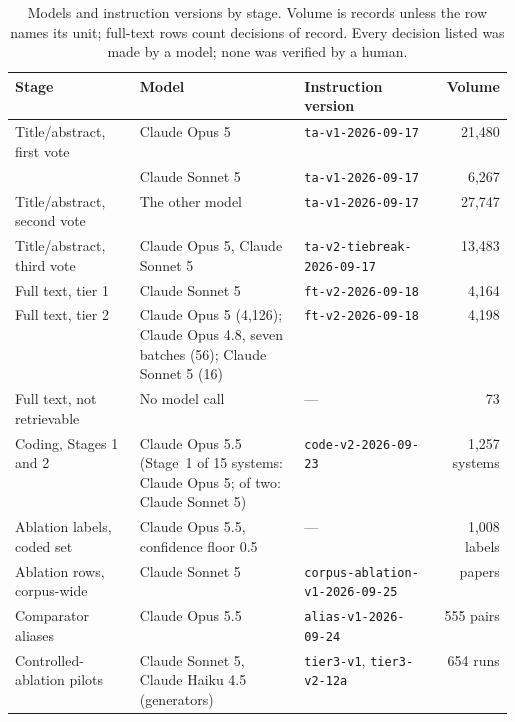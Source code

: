 \begin{table}[t]
  \footnotesize
  \caption{Models and instruction versions by stage. Volume is records unless the row names its unit;
  full-text rows count decisions of record. Every decision listed was made by a model; none was verified
  by a human.}
  \label{tab:implementation}
  \begin{tabular}{@{}p{0.25\linewidth} p{0.33\linewidth} l r@{}}
    \toprule
    Stage & Model & Instruction version & Volume \\
    \midrule
    Title/abstract, first vote & Claude Opus 5 & \texttt{ta-v1-2026-09-17} & 21,480 \\
     & Claude Sonnet 5 & \texttt{ta-v1-2026-09-17} & 6,267 \\
    Title/abstract, second vote & The other model & \texttt{ta-v1-2026-09-17} & 27,747 \\
    Title/abstract, third vote & Claude Opus 5, Claude Sonnet 5 & \texttt{ta-v2-tiebreak-2026-09-17} &
      13,483 \\
    \midrule
    Full text, tier 1 & Claude Sonnet 5 & \texttt{ft-v2-2026-09-18} & 4,164 \\
    Full text, tier 2 & Claude Opus 5 (4,126); Claude Opus 4.8, seven batches (56); Claude Sonnet 5 (16)
      & \texttt{ft-v2-2026-09-18} & 4,198 \\
    Full text, not retrievable & No model call & --- & 73 \\
    \midrule
    Coding, Stages 1 and 2 & Claude Opus 5.5 (Stage~1 of 15 systems: Claude Opus 5; of two: Claude
      Sonnet 5) & \texttt{code-v2-2026-09-23} & 1,257 systems \\
    Ablation labels, coded set & Claude Opus 5.5, confidence floor 0.5 & --- & 1,008 labels \\
    Ablation rows, corpus-wide & Claude Sonnet 5 & \texttt{corpus-ablation-v1-2026-09-25} &
      \rqCorpusPapersExtracted{} papers \\
    Comparator aliases & Claude Opus 5.5 & \texttt{alias-v1-2026-09-24} & 555 pairs \\
    Controlled-ablation pilots & Claude Sonnet 5, Claude Haiku 4.5 (generators) & \texttt{tier3-v1},
      \texttt{tier3-v2-12a} & 654 runs \\
    \bottomrule
  \end{tabular}
\end{table}
